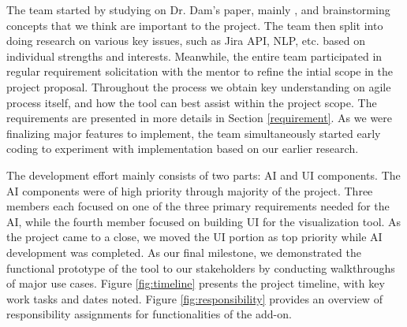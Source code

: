 The team started by studying on Dr. Dam's paper, mainly \cite{dam1}, and brainstorming concepts that we think are important to the project. The team then split into doing research on various key issues, such as Jira API, NLP, etc. based on individual strengths and interests. Meanwhile, the entire team participated in regular requirement solicitation with the mentor to refine the intial scope in the project proposal. Throughout the process we obtain key understanding on agile process itself, and how the tool can best assist within the project scope. The requirements are presented in more details in Section \ref{requirement}. As we were finalizing major features to implement, the team simultaneously started early coding to experiment with implementation based on our earlier research. 

The development effort mainly consists of two parts: AI and UI components.  The AI components were of high priority through majority of the project. Three members each focused on one of the three primary requirements needed for the AI, while the fourth member focused on building UI for the visualization tool. As the project came to a close, we moved the UI portion as top priority while AI development was completed. As our final milestone, we demonstrated the functional prototype of the tool to our stakeholders by conducting walkthroughs of major use cases. Figure \ref{fig:timeline} presents the project timeline, with key work tasks and dates noted. Figure \ref{fig:responsibility} provides an overview of responsibility assignments for functionalities of the add-on.

